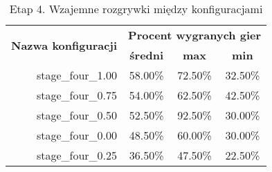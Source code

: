 \begin{longtable}[c]{|r|c|c|c|}
\caption{\label{tab:results/stage_four_all_play_all}Etap 4. Wzajemne rozgrywki między konfiguracjami} \\
\hline

\multirow{2}{*}{\textbf{Nazwa konfiguracji}} & \multicolumn{3}{|c|}{\textbf{Procent wygranych gier}} \\
\cline{2-4}
&\textbf{średni} & \textbf{max} & \textbf{min} \\
\hline
stage\_four\_1.00 & 58.00\% & 72.50\% & 32.50\% \\
\hline
stage\_four\_0.75 & 54.00\% & 62.50\% & 42.50\% \\
\hline
stage\_four\_0.50 & 52.50\% & 92.50\% & 30.00\% \\
\hline
stage\_four\_0.00 & 48.50\% & 60.00\% & 30.00\% \\
\hline
stage\_four\_0.25 & 36.50\% & 47.50\% & 22.50\% \\
\hline
\end{longtable}
